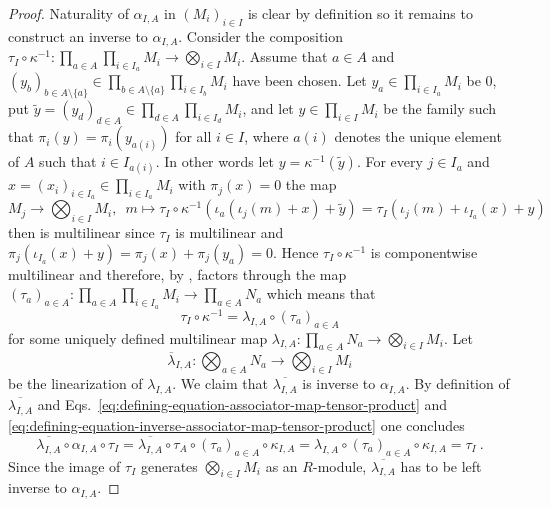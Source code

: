 \begin{proof}
  Naturality of $\alpha_{I,A}$ in  $(M_i)_{i\in I}$ is clear by definition so it remains to
  construct an inverse to $\alpha_{I,A}$.  Consider the composition
  $\tau_I \circ \kappa^{-1}: \prod_{a \in A} \prod_{i \in I_a} M_i
   \to \bigotimes_{i\in I} M_i$. Assume that $a \in A$ and
  $(y_b)_{b\in A\setminus\{a\}} \in \prod_{b \in A\setminus\{a\}} \prod_{i \in I_b} M_i$
  have been chosen. Let $y_a\in \prod_{i \in I_a} M_i$ be $0$, put
  $\widetilde{y} =(y_d)_{d\in A} \in \prod_{d \in A}  \prod_{i \in I_d} M_i$, and let
  $y\in  \prod_{i \in I} M_i$ be the family such that $\pi_i(y) = \pi_i (y_{a(i)})$ for
  all $i\in I$, where $a(i)$ denotes the unique element of $A$  such that
  $i\in I_{a(i)}$. In other words let $y =\kappa^{-1} (\widetilde{y})$.
  For every $j\in I_a$ and $x= (x_i)_{i\in I_a}\in \prod_{i\in I_a}M_i$
  with $\pi_j (x)=0$ the map
  \[
    M_j \to \bigotimes_{i\in I} M_i,\enspace m \mapsto \tau_I \circ \kappa^{-1} \left( \iota_a (\iota_j(m)+x)+\widetilde{y}\right)
    = \tau_I \left( \iota_j (m) + \iota_{I_a}(x) + y \right)
  \]
  then is multilinear since $\tau_I$ is multilinear and $\pi_j(\iota_{I_a}(x) + y)=\pi_j(x) +\pi_j(y_a) = 0$.
  Hence $\tau_I \circ \kappa^{-1}$ is componentwise multilinear and therefore,
  by , factors
  through the map
  $(\tau_a)_{a\in A} : \prod_{a\in A} \prod_{i\in I_a} M_i\to \prod_{a\in A} N_a$
  which means that
  \begin{equation}\label{eq:defining-equation-inverse-associator-map-tensor-product}
    \tau_I \circ \kappa^{-1} = \lambda_{I,A}\circ (\tau_a)_{a\in A}
  \end{equation}
  for some uniquely defined multilinear map
  $\lambda_{I,A} : \prod_{a\in A} N_a\to\bigotimes_{i\in I} M_i$.
  Let
  \[ \overline{\lambda}_{I,A} : \bigotimes_{a\in A} N_a\to\bigotimes_{i\in I} M_i\]
  be the linearization of $\lambda_{I,A}$.
  We claim that $\overline{\lambda_{I,A}}$ is inverse to $\alpha_{I,A}$.
  By definition of $\overline{\lambda_{I,A}}$ and 
  Eqs.~\eqref{eq:defining-equation-associator-map-tensor-product} and
  \eqref{eq:defining-equation-inverse-associator-map-tensor-product} one concludes
  \[
    \overline{\lambda_{I,A}} \circ \alpha_{I,A} \circ \tau_I =
    \overline{\lambda_{I,A}} \circ \tau_A \circ (\tau_a)_{a\in A} \circ \kappa_{I,A} =
    \lambda_{I,A} \circ (\tau_a)_{a\in A} \circ \kappa_{I,A} = \tau_I \ . 
  \]
  Since the image of $\tau_I$ generates $\bigotimes_{i\in I} M_i$ as an $R$-module,
  $\overline{\lambda_{I,A}}$ has to be left inverse to $\alpha_{I,A}$.

\end{proof}

